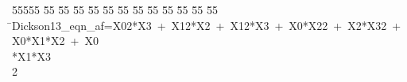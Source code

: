 %
%
\begin{tabbing}
55555 \= 55 \= 55 \= 55 \= 55 \= 55 \= 55 \= 55 \= 55 \= 55 \= 55 \= 55 \= 55 \= \>Dickson13\_eqn\_af=X02*X3\ +\ X12*X2\ +\ X12*X3\ +\ X0*X22\ +\ X2*X32\ +\ X0*X1*X2\ +\ X0\\[0pt]
\>*X1*X3\\[0pt]
2\>\end{tabbing}
